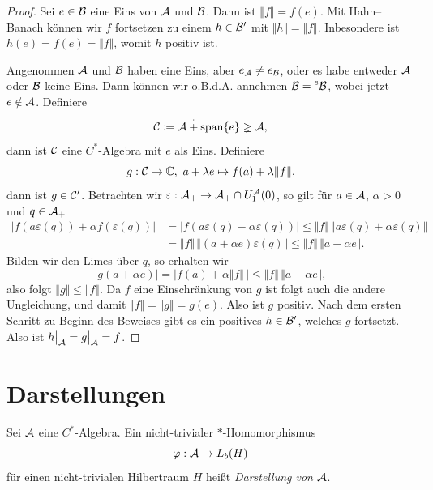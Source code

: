 \begin{proof}
    Sei $e \in \mathcal{B}$ eine Eins von $\mathcal{A}$ und $\mathcal{B}$. Dann ist $\Vert f \Vert = f(e)$. Mit Hahn--Banach können wir $f$ fortsetzen zu einem $h \in \mathcal{B}'$ mit $\Vert h \Vert = \Vert f \Vert$. Inbesondere ist $h(e) = f(e) = \Vert f \Vert$, womit $h$ positiv ist.

    Angenommen $\mathcal{A}$ und $\mathcal{B}$ haben eine Eins, aber $e_{\mathcal{A}} \neq e_{\mathcal{B}}$, oder es habe entweder $\mathcal{A}$ oder $\mathcal{B}$ keine Eins. Dann können wir o.B.d.A. annehmen $\mathcal{B} = \prescript{e}{}{\mathcal{B}}$, wobei jetzt $e \notin \mathcal{A}$. Definiere
    \[
        \mathcal{C} \coloneq \mathcal{A} \overset{\cdot}{+} \mathrm{span} \{ e \} \gneq \mathcal{A},
    \]
    dann ist $\mathcal{C}$ eine $C^*$-Algebra mit $e$ als Eins. Definiere
    \[
        g : \mathcal{C} \to \mathbb{C}, \ a + \lambda e \mapsto f(a) + \lambda \Vert f \Vert,
    \]
    dann ist $g \in \mathcal{C}'$. Betrachten wir $\varepsilon : \mathcal{A}_+ \to \mathcal{A}_+ \cap U_1^{\mathcal{A}} (0)$, so gilt für $a \in \mathcal{A}$, $\alpha > 0$ und $q \in \mathcal{A}_+$
    \begin{align*}
        \vert f(a \varepsilon(q)) + \alpha f(\varepsilon(q)) \vert
        &=
        \vert f(a \varepsilon(q) - \alpha \varepsilon(q)) \vert
        \leq
        \Vert f \Vert \, \Vert a \varepsilon(q) + \alpha \varepsilon(q) \Vert
        \\ &=
        \Vert f \Vert \, \Vert (a + \alpha e) \varepsilon(q) \Vert
        \leq
        \Vert f \Vert \, \Vert a + \alpha e \Vert.
    \end{align*}
    Bilden wir den Limes über $q$, so erhalten wir
    \[
        \vert g(a + \alpha e) \vert
        =
        \vert f(a) + \alpha \Vert f \Vert \, \vert
        \leq
        \Vert f \Vert \, \Vert a + \alpha e \Vert,
    \]
    also folgt $\Vert g \Vert \leq \Vert f \Vert$. Da $f$ eine Einschränkung von $g$ ist folgt auch die andere Ungleichung, und damit $\Vert f \Vert = \Vert g \Vert = g(e)$. Also ist $g$ positiv. Nach dem ersten Schritt zu Beginn des Beweises gibt es ein positives $h \in \mathcal{B}'$, welches $g$ fortsetzt. Also ist $\restr{h}{\Aa} = \restr{g}{\Aa} = f$.
\end{proof}

\chapter{Darstellungen}

\begin{definition}
    Sei $\mathcal{A}$ eine $C^*$-Algebra. Ein nicht-trivialer $\ast$-Homomorphismus
    \[
        \varphi : \mathcal{A} \to L_b(H)
    \]
    für einen nicht-trivialen Hilbertraum $H$ heißt \emph{Darstellung von $\mathcal{A}$}.
\end{definition}

